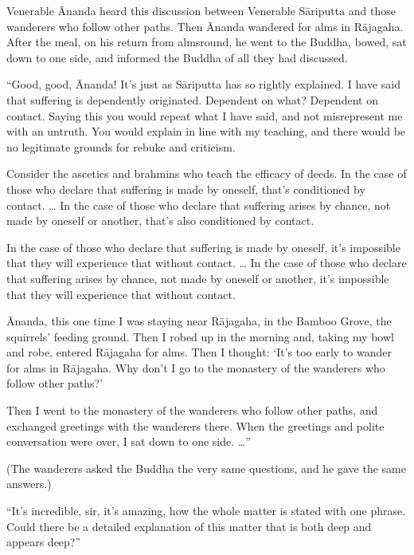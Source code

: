 \documentclass[12pt,openany]{book}%
\begin{document}
Venerable Ānanda heard this discussion between Venerable \textsanskrit{Sāriputta} and those wanderers who follow other paths. Then Ānanda wandered for alms in \textsanskrit{Rājagaha}. After the meal, on his return from almsround, he went to the Buddha, bowed, sat down to one side, and informed the Buddha of all they had discussed. 

“Good, good, Ānanda! It’s just as \textsanskrit{Sāriputta} has so rightly explained. I have said that suffering is dependently originated. Dependent on what? Dependent on contact. Saying this you would repeat what I have said, and not misrepresent me with an untruth. You would explain in line with my teaching, and there would be no legitimate grounds for rebuke and criticism. 

Consider the ascetics and brahmins who teach the efficacy of deeds. In the case of those who declare that suffering is made by oneself, that’s conditioned by contact. … In the case of those who declare that suffering arises by chance, not made by oneself or another, that’s also conditioned by contact. 

In the case of those who declare that suffering is made by oneself, it’s impossible that they will experience that without contact. … In the case of those who declare that suffering arises by chance, not made by oneself or another, it’s impossible that they will experience that without contact. 

Ānanda, this one time I was staying near \textsanskrit{Rājagaha}, in the Bamboo Grove, the squirrels’ feeding ground. Then I robed up in the morning and, taking my bowl and robe, entered \textsanskrit{Rājagaha} for alms. Then I thought: ‘It’s too early to wander for alms in \textsanskrit{Rājagaha}. Why don’t I go to the monastery of the wanderers who follow other paths?’ 

Then I went to the monastery of the wanderers who follow other paths, and exchanged greetings with the wanderers there. When the greetings and polite conversation were over, I sat down to one side. …” 

(The wanderers asked the Buddha the very same questions, and he gave the same answers.) 

“It’s incredible, sir, it’s amazing, how the whole matter is stated with one phrase. Could there be a detailed explanation of this matter that is both deep and appears deep?” 
\end{document}
